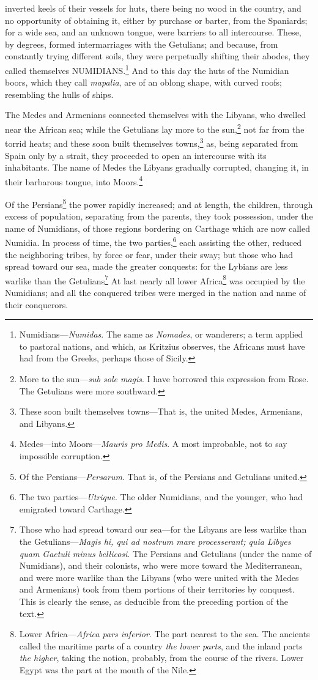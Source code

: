 inverted keels of their vessels for huts, there being no wood in the
country, and no opportunity of obtaining it, either by purchase or
barter, from the Spaniards; for a wide sea, and an unknown tongue,
were barriers to all intercourse. These, by degrees, formed
intermarriages with the Getulians; and because, from constantly trying
different soils, they were perpetually shifting their abodes, they
called themselves NUMIDIANS.\footnote{Numidians—\emph{Numidas}. The same as \emph{Nomades}, or wanderers; a
term applied to pastoral nations, and which, as Kritzius observes,
the Africans must have had from the Greeks, perhaps those of Sicily.} And to this day the huts of the
Numidian boors, which they call \emph{mapalia}, are of an oblong shape,
with curved roofs; resembling the hulls of ships.

The Medes and Armenians connected themselves with the Libyans, who
dwelled near the African sea; while the Getulians lay more to the
sun,\footnote{More to the sun—\emph{sub sole magis}. I have borrowed this
expression from Rose. The Getulians were more southward.} not far from the torrid heats; and these soon built
themselves towns,\footnote{These soon built themselves towns—That is, the united Medes,
Armenians, and Libyans.} as, being separated from Spain only by a strait,
they proceeded to open an intercourse with its inhabitants. The name
of Medes the Libyans gradually corrupted, changing it, in their
barbarous tongue, into Moors.\footnote{Medes—into Moors—\emph{Mauris pro Medis}. A most improbable,
not to say impossible corruption.}

Of the Persians\footnote{Of the Persians—\emph{Persarum}. That is, of the Persians and
Getulians united.} the power rapidly increased; and at length, the
children, through excess of population, separating from the parents,
they took possession, under the name of Numidians, of those regions
bordering on Carthage which are now called Numidia. In process of
time, the two parties,\footnote{The two parties—\emph{Utrique}. The older Numidians, and the
younger, who had emigrated toward Carthage.} each assisting the other, reduced the
neighboring tribes, by force or fear, under their sway; but those who
had spread toward our sea, made the greater conquests: for the Lybians
are less warlike than the Getulians\footnote{Those who had spread toward our sea—for the Libyans are
less warlike than the Getulians—\emph{Magis hi, qui ad nostrum mare
processerant; quia Libyes quam Gaetuli minus bellicosi}. The Persians
and Getulians (under the name of Numidians), and their colonists, who
were more toward the Mediterranean, and were more warlike than the
Libyans (who were united with the Medes and Armenians) took from them
portions of their territories by conquest. This is clearly the sense,
as deducible from the preceding portion of the text.} At last nearly all lower
Africa\footnote{Lower Africa—\emph{Africa pars inferior}. The part nearest to the
sea. The ancients called the maritime parts of a country \emph{the lower
parts}, and the inland parts \emph{the higher}, taking the notion, probably,
from the course of the rivers. Lower Egypt was the part at the mouth of
the Nile.} was occupied by the Numidians; and all the conquered tribes
were merged in the nation and name of their conquerors.

